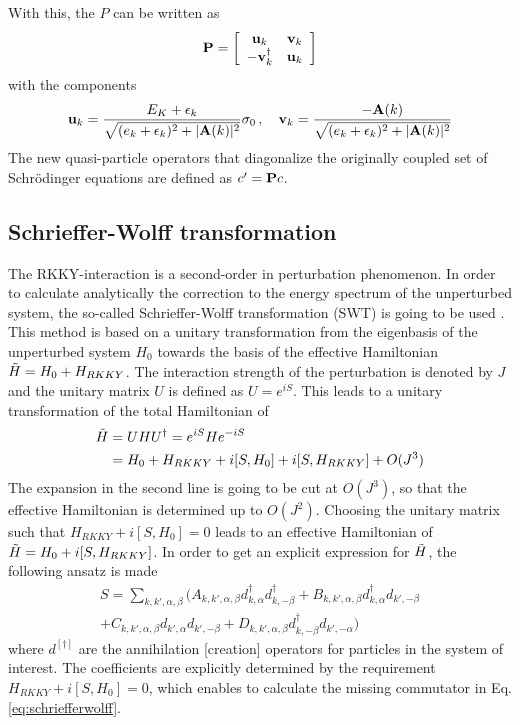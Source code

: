 With this, the $P$ can be written as
\begin{align}\nonumber
    \vb{P} = \left[ \begin{array}{cc}
        \vb{u}_k & \vb{v}_k \\
        -\vb{v}^{\dag}_k & \vb{u}_k
    \end{array} \right]
\end{align}
with the components
\begin{align}
    \vb{u}_k = \frac{E_K + \epsilon_k}{\sqrt{(e_k + \epsilon_k)^2 + |\vb{A}(k)|^2}} \sigma_0 \, , \quad \vb{v}_k = \frac{- \vb{A}(k)}{\sqrt{(e_k + \epsilon_k)^2 + |\vb{A}(k)|^2}}
\end{align}
The new quasi-particle operators that diagonalize the originally coupled set of Schrödinger equations are defined as $ c' = \vb{P} c$.

\subsection{Schrieffer-Wolff transformation} \label{sec:SchriefferWolff}
The RKKY-interaction is a second-order in perturbation phenomenon.
In order to calculate analytically the correction to the energy spectrum of the unperturbed system, the so-called Schrieffer-Wolff transformation (SWT) is going to be used \cite{schrieffer1966relation}.
This method is based on a unitary transformation from the eigenbasis of the unperturbed system $H_0$ towards the basis of the effective Hamiltonian $\Tilde{H}=H_0 + H_{RKKY}$.\newline
The interaction strength of the perturbation is denoted by $J$ and the unitary matrix $U$ is defined as $U=e^{iS}$.
This leads to a unitary transformation of the total Hamiltonian of
\begin{align} \nonumber
    \Tilde{H} &= UHU^{\dag} = e^{iS} H e^{-iS} \\ \label{eq:schriefferwolff}
    &= H_0 + H_{RKKY} + i[S,H_0] + i[S,H_{RKKY}] + O(J^3)
\end{align}
The expansion in the second line is going to be cut at $O(J^3)$, so that the effective Hamiltonian is determined up to $O(J^2)$.
Choosing the unitary matrix such that $H_{RKKY} + i[S,H_0]=0 $ leads to an effective Hamiltonian of $\Tilde{H} = H_0 + i[S,H_{RKKY}]$. \newline
In order to get an explicit expression for $\Tilde{H}$, the following ansatz is made 
\begin{align}
    S = \sum_{k,k',\alpha, \beta} (A_{k,k',\alpha,\beta} d^{\dag}_{k,\alpha}d^{\dag}_{k,-\beta} + B_{k,k',\alpha,\beta} d^{\dag}_{k,\alpha}d_{k',-\beta} \\ 
    + C_{k,k',\alpha,\beta} d_{k',\alpha}d_{k',-\beta}
    + D_{k,k',\alpha,\beta} d^{\dag}_{k,-\beta}d_{k',-\alpha}) \nonumber
\end{align}
where $d^{[\dag]}$ are the annihilation [creation] operators for particles in the system of interest. 
The coefficients are explicitly determined by the requirement $H_{RKKY} + i[S,H_0]=0 $, which enables to calculate the missing commutator in Eq. \eqref{eq:schriefferwolff}.


